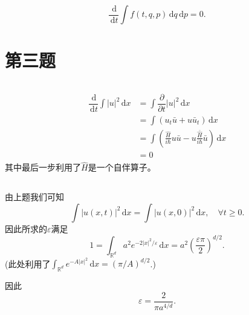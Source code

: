 \documentclass[a4paper,  11pt]{ctexart}
\newcommand\bbR{\mathbb{R}}
\newcommand\dd{\,\mathrm{d}}
\newcommand\pd[2]{\dfrac{\partial {#1}}{\partial {#2}}}
\newcommand\od[2]{\dfrac{\dd {#1}}{\dd {#2}}}
\begin{document}
\[  
\od{}{t}\int f(t,q,p)\dd q\dd p  = 0.
\]

\section{第三题}
\subsection{}
\begin{align*}
  \begin{aligned}
\od{}{t}\int |u|^2\dd x &= \int \pd{}{t}|u|^2 \dd x \\
&= \int (u_t\bar{u}+u\bar{u}_t)\dd x \\
&= \int \left(\frac{\hat{H}}{i\hbar}u\bar{u}
-u\frac{\bar{\hat{H}}}{i\hbar}\bar{u}
\right)\dd x \\ 
&= 0
   \end{aligned}
\end{align*}
其中最后一步利用了$\hat{H}$是一个自伴算子。
\subsection{}
由上题我们可知
\[ 
   \int |u(x,t)|^2 \dd x = \int |u(x,0)|^2 \dd x, \quad \forall t\geq
   0.
\]
因此所求的$\varepsilon$满足
\[  
1 = \int_{\bbR^d} a^2e^{-2|x|^2/\varepsilon}\dd x =
a^2\left(\frac{\varepsilon\pi}{2}\right)^{d/2}.
\]
(此处利用了$\int_{\bbR^d} e^{-A|x|^2}\dd x = (\pi/A)^{d/2}$.)

因此 
\[   
\varepsilon = \frac{2}{\pi a^{4/d}}.
\]
\end{document}
